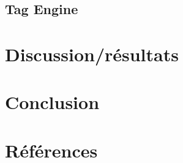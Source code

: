 \documentclass[a4paper, 12pt]{article}
\begin{document}
\subsection{Tag Engine}\label{tag_engine_realisation}



\section{Discussion/résultats} %



\section{Conclusion} %


\newpage
\section{Références} %


\end{document}
